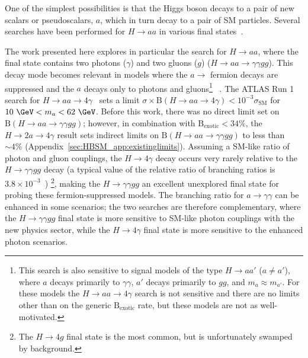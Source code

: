 One of the simplest possibilities is that the Higgs boson decays to a pair of 
new scalars or pseudoscalars, $a$, which in turn decay to a pair of SM particles.
Several searches have been performed for $H\rightarrow a a$ in various final states~\cite{Khachatryan:2017mnf,Aad:2015sva,Aad:2015oqa}.

The work presented here explores in particular the search for $H\rightarrow a a$, where the final state contains two photons ($\gamma$) and two gluons ($g$) ($H\rightarrow aa \rightarrow \gamma\gamma gg$).
This decay mode becomes relevant in models where the $a\rightarrow$ fermion decays are suppressed 
and the $a$ decays only to photons and gluons\footnote{This search is also sensitive to signal models of the type $H\rightarrow a a'$ ($a\ne a'$), where $a$ decays primarily to $\gamma\gamma$, $a'$ decays primarily to $gg$, and $m_a\approx m_{a'}$. For these models the $H\rightarrow aa \rightarrow 4\gamma$ search is not sensitive and there are no limits other than on the generic $\text{B}_\text{exotic}$ rate, but these models are not as well-motivated.}
~\cite{Curtin:2013fra,hep-ph/0703247}.
The ATLAS Run 1 search for $H\rightarrow aa \to 4\gamma$~\cite{Aad:2015bua} sets 
a limit $\sigma\times \text{B}(H\to aa\rightarrow 4\gamma)<10^{-3}\sigma_\text{SM}$ 
for $10~\GeV<m_a<62~\GeV$.
Before this work, there was no direct limit set on $\text{B}(H\rightarrow aa\rightarrow \gamma\gamma gg)$;
however, in combination with $\text{B}_\text{exotic}<34\%$, 
the $H\rightarrow 2a \to 4\gamma$ result sets indirect limits on $\text{B}(H\rightarrow aa\rightarrow \gamma\gamma gg)$ to less than $\sim4\%$ (Appendix~\ref{sec:HBSM_app:existinglimits}).
Assuming a SM-like ratio of photon and gluon couplings, 
the $H\rightarrow 4\gamma$ decay occurs very rarely relative to the $H\rightarrow \gamma\gamma gg$ decay (a typical value of the relative ratio of branching ratios is $3.8\times10^{-3}$~\cite{hep-ph/0703247})
\footnote{The $H\rightarrow 4g$ final state is the most common, but is unfortunately swamped by background.},
making the $H\rightarrow \gamma\gamma gg$ an excellent unexplored final state for probing these fermion-suppressed models.
The branching ratio for $a\rightarrow \gamma\gamma$ can be enhanced in some scenarios;
the two searches are therefore complementary, 
where the $H\rightarrow \gamma\gamma gg$ final state is more sensitive to SM-like photon couplings 
with the new physics sector, 
while the $H\rightarrow 4\gamma$ final state is more sensitive to the enhanced photon scenarios. 

